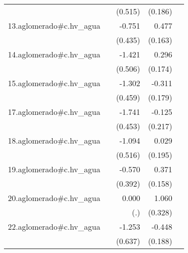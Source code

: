 {\begin{longtable}{l*{4}{D{.}{.}{-1}}}
            &                     &     (0.515)         &     (0.186)         &                     \\
\addlinespace
13.aglomerado#c.hv\_agua&                     &      -0.751         &       0.477\sym{**} &                     \\
            &                     &     (0.435)         &     (0.163)         &                     \\
\addlinespace
14.aglomerado#c.hv\_agua&                     &      -1.421\sym{**} &       0.296         &                     \\
            &                     &     (0.506)         &     (0.174)         &                     \\
\addlinespace
15.aglomerado#c.hv\_agua&                     &      -1.302\sym{**} &      -0.311         &                     \\
            &                     &     (0.459)         &     (0.179)         &                     \\
\addlinespace
17.aglomerado#c.hv\_agua&                     &      -1.741\sym{***}&      -0.125         &                     \\
            &                     &     (0.453)         &     (0.217)         &                     \\
\addlinespace
18.aglomerado#c.hv\_agua&                     &      -1.094\sym{*}  &       0.029         &                     \\
            &                     &     (0.516)         &     (0.195)         &                     \\
\addlinespace
19.aglomerado#c.hv\_agua&                     &      -0.570         &       0.371\sym{*}  &                     \\
            &                     &     (0.392)         &     (0.158)         &                     \\
\addlinespace
20.aglomerado#c.hv\_agua&                     &       0.000         &       1.060\sym{**} &                     \\
            &                     &         (.)         &     (0.328)         &                     \\
\addlinespace
22.aglomerado#c.hv\_agua&                     &      -1.253\sym{*}  &      -0.448\sym{*}  &                     \\
            &                     &     (0.637)         &     (0.188)         &                     \\

\end{longtable}}
